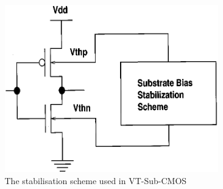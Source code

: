 \begin{columns}
	\begin{column}{0.5\textwidth}
	\end{column}
	\begin{column}{0.5\textwidth}
		\begin{figure}
			\includegraphics[width=350px]{../../images/vtsubcmos.png}
			\caption{The stabilisation scheme used in VT-Sub-CMOS \cite{IEEEVLSIRobustSTL} }
			\label{fig:vtsubcmos}
		\end{figure}
	\end{column}
\end{columns}
